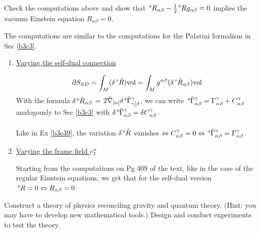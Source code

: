 \documentclass[10pt]{article}
\begin{document}
	
\begin{example}
	Check the computations above and show that ${}^+\! R_{\alpha\beta}-\frac12{}^+\! Rg_{\alpha\beta} = 0$ implies the vacuum Einstein equation $R_{\alpha\beta} = 0$.
\end{example}
\sol The computations are similar to the computations for the Palatini formalism in Sec \ref{b3c3}.
\begin{enumerate}
	\item \underline{Varying the self-dual connection}
	
	$$
	\partial S_{SD} = \int_M (\delta {}^+\!\tilde{R})\text{vol} = \int_M g^{\alpha\beta} (\delta {}^+\!\tilde{R}_{\alpha\beta})\text{vol}
	$$
	With the formula $\delta {}^+\!\tilde{R}_{\alpha\beta}$ = $2\tilde{\nabla}_{[\alpha]}\delta{}^+\!\tilde{\Gamma}_{\gamma]\beta}^\gamma$, we can write ${}^+\!\tilde{\Gamma}_{\alpha\beta}^\gamma = \Gamma_{\alpha\beta}^\gamma + C_{\alpha\beta}^\gamma$ analogously to Sec \ref{b3c3} with $\delta{}^+\!\tilde{\Gamma}_{\alpha\beta}^\gamma = \delta C_{\alpha\beta}^\gamma$.\\\\
	Like in Ex \ref{b3e39}, the variation $\delta {}^+\!\tilde{R}$ vanishes $\Leftrightarrow C_{\alpha\beta}^\gamma = 0 \Leftrightarrow {}^+\!\tilde{\Gamma}_{\alpha\beta}^\gamma = \Gamma_{\alpha\beta}^\gamma$.

	\item \underline{Varying the frame field $e_I^\alpha$}
	
	Starting from the computations on Pg 409 of the text, like in the case of the regular Einstein equations, we get that for the self-dual version ${}^+\! R = 0 \Leftrightarrow R_{\alpha\beta} = 0$.
\end{enumerate}


\begin{example}
	Construct a theory of physics reconciling gravity and quantum theory. (Hint: you may have to develop new mathematical tools.) Design and conduct experiments to test the theory.
\end{example}
\sol \Coffeecup


































\newpage


\end{document}
